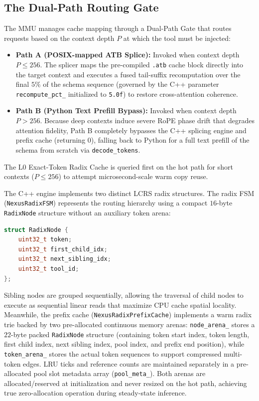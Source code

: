 \subsection{The Dual-Path Routing Gate}
The MMU manages cache mapping through a Dual-Path Gate that routes requests based on the context depth $P$ at which the tool must be injected:
\begin{itemize}
  \item \textbf{Path A (POSIX-mapped ATB Splice):} Invoked when context depth $P \le 256$. The splicer maps the pre-compiled \texttt{.atb} cache block directly into the target context and executes a fused tail-suffix recomputation over the final $5\%$ of the schema sequence (governed by the C++ parameter \texttt{recompute\_pct\_} initialized to \texttt{5.0f}) to restore cross-attention coherence.
  \item \textbf{Path B (Python Text Prefill Bypass):} Invoked when context depth $P > 256$. Because deep contexts induce severe RoPE phase drift that degrades attention fidelity, Path B completely bypasses the C++ splicing engine and prefix cache (returning $0$), falling back to Python for a full text prefill of the schema from scratch via \texttt{decode_tokens}.
\end{itemize}
The L0 Exact-Token Radix Cache is queried first on the hot path for short contexts ($P \le 256$) to attempt microsecond-scale warm copy reuse.

The C++ engine implements two distinct LCRS radix structures. The radix FSM (\texttt{NexusRadixFSM}) represents the routing hierarchy using a compact $16$-byte \texttt{RadixNode} structure without an auxiliary token arena:
\begin{lstlisting}[language=C++]
struct RadixNode {
    uint32_t token;
    uint32_t first_child_idx;
    uint32_t next_sibling_idx;
    uint32_t tool_id;
};
\end{lstlisting}
Sibling nodes are grouped sequentially, allowing the traversal of child nodes to execute as sequential linear reads that maximize CPU cache spatial locality. Meanwhile, the prefix cache (\texttt{NexusRadixPrefixCache}) implements a warm radix trie backed by two pre-allocated continuous memory arenas: \texttt{node\_arena\_} stores a $22$-byte packed \texttt{RadixNode} structure (containing token start index, token length, first child index, next sibling index, pool index, and prefix end position), while \texttt{token\_arena\_} stores the actual token sequences to support compressed multi-token edges. LRU ticks and reference counts are maintained separately in a pre-allocated pool slot metadata array (\texttt{pool\_meta\_}). Both arenas are allocated/reserved at initialization and never resized on the hot path, achieving true zero-allocation operation during steady-state inference.

